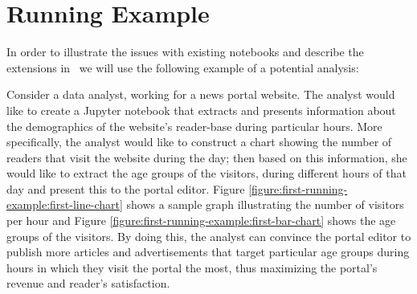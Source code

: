 
\section{Running Example}

In order to illustrate the issues with existing notebooks and describe the extensions in \projname\, we will use the following example of a potential analysis:

\begin{example}
Consider a data analyst, working for a news portal website. The analyst would like to create a Jupyter notebook that extracts and presents information about the demographics of the website's reader-base during particular hours. More specifically, the analyst would like to construct a chart showing the number of readers that visit the website during the day; then based on this information, she would like to extract the age groups of the visitors, during different hours of that day and present this to the portal editor. Figure \ref{figure:first-running-example:first-line-chart} shows a sample graph illustrating the number of visitors per hour and Figure \ref{figure:first-running-example:first-bar-chart} shows the age groups of the visitors. By doing this, the analyst can convince the portal editor to publish more articles and advertisements that target particular age groups during hours in which they visit the portal the most, thus maximizing the portal's revenue and reader's satisfaction.
\end{example}

